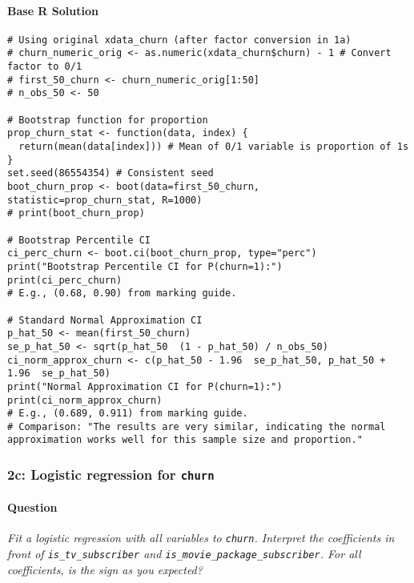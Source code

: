 \documentclass[12pt,a4paper]{article}
\newcommand{\Rcode}[1]{\texttt{#1}} %
\begin{document}
        \paragraph{Base R Solution}
\begin{lstlisting}
# Using original xdata_churn (after factor conversion in 1a)
# churn_numeric_orig <- as.numeric(xdata_churn$churn) - 1 # Convert factor to 0/1
# first_50_churn <- churn_numeric_orig[1:50]
# n_obs_50 <- 50

# Bootstrap function for proportion
prop_churn_stat <- function(data, index) {
  return(mean(data[index])) # Mean of 0/1 variable is proportion of 1s
}
set.seed(86554354) # Consistent seed
boot_churn_prop <- boot(data=first_50_churn, statistic=prop_churn_stat, R=1000)
# print(boot_churn_prop)

# Bootstrap Percentile CI
ci_perc_churn <- boot.ci(boot_churn_prop, type="perc")
print("Bootstrap Percentile CI for P(churn=1):")
print(ci_perc_churn) 
# E.g., (0.68, 0.90) from marking guide.

# Standard Normal Approximation CI
p_hat_50 <- mean(first_50_churn)
se_p_hat_50 <- sqrt(p_hat_50  (1 - p_hat_50) / n_obs_50)
ci_norm_approx_churn <- c(p_hat_50 - 1.96  se_p_hat_50, p_hat_50 + 1.96  se_p_hat_50)
print("Normal Approximation CI for P(churn=1):")
print(ci_norm_approx_churn)
# E.g., (0.689, 0.911) from marking guide.
# Comparison: "The results are very similar, indicating the normal approximation works well for this sample size and proportion."
\end{lstlisting}

    \subsubsection{2c: Logistic regression for \Rcode{churn}}
        \paragraph{Question}
        \textit{Fit a logistic regression with all variables to \Rcode{churn}. Interpret the coefficients in front of \Rcode{is\_tv\_subscriber} and \Rcode{is\_movie\_package\_subscriber}. For all coefficients, is the sign as you expected?}
\end{document}
